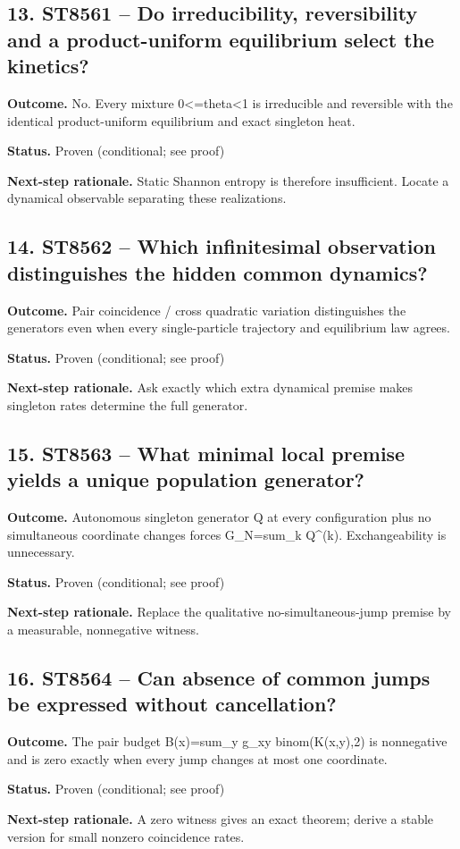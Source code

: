 \subsection*{13. ST8561 -- Do irreducibility, reversibility and a product-uniform equilibrium select the kinetics?}
\noindent\textbf{Outcome.} No. Every mixture 0\textless{}=theta\textless{}1 is irreducible and reversible with the identical product-uniform equilibrium and exact singleton heat.\par
\noindent\textbf{Status.} Proven (conditional; see proof)\par
\noindent\textbf{Next-step rationale.} Static Shannon entropy is therefore insufficient. Locate a dynamical observable separating these realizations.\par\medskip
\subsection*{14. ST8562 -- Which infinitesimal observation distinguishes the hidden common dynamics?}
\noindent\textbf{Outcome.} Pair coincidence / cross quadratic variation distinguishes the generators even when every single-particle trajectory and equilibrium law agrees.\par
\noindent\textbf{Status.} Proven (conditional; see proof)\par
\noindent\textbf{Next-step rationale.} Ask exactly which extra dynamical premise makes singleton rates determine the full generator.\par\medskip
\subsection*{15. ST8563 -- What minimal local premise yields a unique population generator?}
\noindent\textbf{Outcome.} Autonomous singleton generator Q at every configuration plus no simultaneous coordinate changes forces G\_N=sum\_k Q\textasciicircum{}(k). Exchangeability is unnecessary.\par
\noindent\textbf{Status.} Proven (conditional; see proof)\par
\noindent\textbf{Next-step rationale.} Replace the qualitative no-simultaneous-jump premise by a measurable, nonnegative witness.\par\medskip
\subsection*{16. ST8564 -- Can absence of common jumps be expressed without cancellation?}
\noindent\textbf{Outcome.} The pair budget B(x)=sum\_y g\_xy binom(K(x,y),2) is nonnegative and is zero exactly when every jump changes at most one coordinate.\par
\noindent\textbf{Status.} Proven (conditional; see proof)\par
\noindent\textbf{Next-step rationale.} A zero witness gives an exact theorem; derive a stable version for small nonzero coincidence rates.\par\medskip
